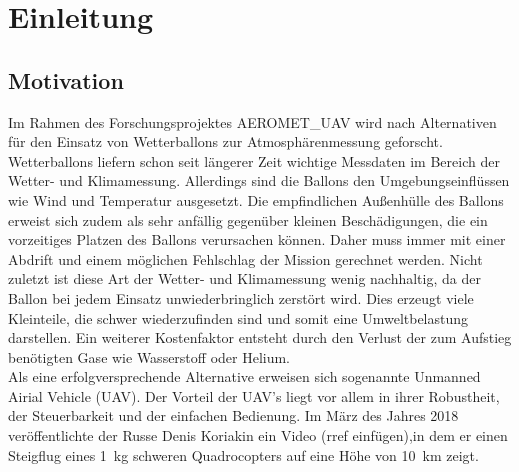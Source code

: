 \chapter{Einleitung}
\label{chap:Einleitung}

\section{Motivation}
\label{sec:motivation}
Im Rahmen des Forschungsprojektes AEROMET\_UAV wird nach Alternativen für den Einsatz von Wetterballons zur Atmosphärenmessung geforscht. Wetterballons liefern schon seit längerer Zeit wichtige Messdaten im Bereich der Wetter- und Klimamessung. Allerdings sind die Ballons den Umgebungseinflüssen wie Wind und Temperatur ausgesetzt. Die empfindlichen Außenhülle des Ballons erweist sich zudem als sehr anfällig gegenüber kleinen Beschädigungen, die ein vorzeitiges Platzen des Ballons verursachen können. Daher muss immer mit einer Abdrift und einem möglichen Fehlschlag der Mission gerechnet werden. Nicht zuletzt ist diese Art der Wetter- und Klimamessung wenig nachhaltig, da der Ballon bei jedem Einsatz unwiederbringlich zerstört wird. Dies erzeugt viele Kleinteile, die schwer wiederzufinden sind und somit eine Umweltbelastung darstellen. Ein weiterer Kostenfaktor entsteht durch den Verlust der zum Aufstieg benötigten Gase wie Wasserstoff oder Helium.\\
Als eine erfolgversprechende Alternative erweisen sich sogenannte Unmanned Airial Vehicle (UAV). Der Vorteil der UAV's liegt vor allem in ihrer Robustheit, der Steuerbarkeit und der einfachen Bedienung. Im März des Jahres 2018 veröffentlichte der Russe Denis Koriakin ein Video (rref einfügen),in dem er einen Steigflug eines \SI{1}{kg} schweren Quadrocopters auf eine Höhe von \SI{10}{km} zeigt. 


